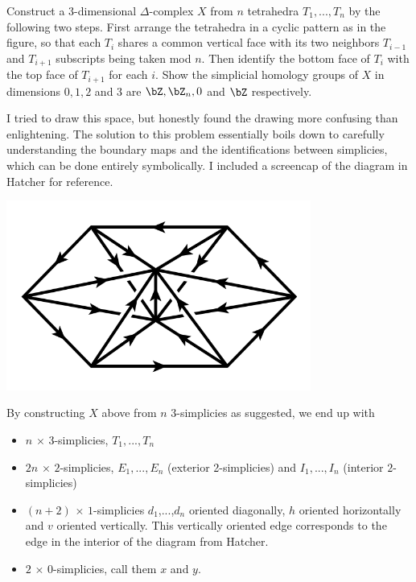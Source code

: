 \begin{homework}[e]
\begin{prf}
  \end{prf}
  \prob[2.1.8] Construct a 3-dimensional $\Delta$-complex $X$ from $n$ tetrahedra $T_1,...,T_n$ by the following two steps. First arrange the tetrahedra in a cyclic pattern as in the figure, so that each $T_i$ shares a common vertical face with its two neighbors $T_{i-1}$ and $T_{i+1}$ subscripts being taken mod $n$. Then identify the bottom face of $T_i$ with the top face of $T_{i+1}$ for each $i$. Show the simplicial homology groups of $X$ in dimensions $0,1,2$ and $3$ are $\bZ,\bZ_n, 0$ and $\bZ$ respectively.
  \begin{prf}
    I tried to draw this space, but honestly found the drawing more confusing than enlightening. The solution to this problem essentially boils down to carefully understanding the boundary maps and the identifications between simplicies, which can be done entirely symbolically. I included a screencap of the diagram in Hatcher for reference.
    \begin{center}
      \includegraphics[width=10cm]{figures/hwk8-fig3.png}
      \label{fig:prob4-1}
    \end{center}
    By constructing $X$ above from $n$ $3$-simplicies as suggested, we end up with
    \begin{itemize}
      \item $n$ $\times$ 3-simplicies, $T_1,...,T_n$
      \item $2n$ $\times$ $2$-simplicies, $E_1,...,E_n$ (exterior 2-simplicies) and $I_1,...,I_n$ (interior $2$-simplicies)
      \item $(n+2)$ $\times$ $1$-simplicies $d_1$,...,$d_n$ oriented diagonally, $h$ oriented horizontally and $v$ oriented vertically. This vertically oriented edge corresponds to the edge in the interior of the diagram from Hatcher.
      \item $2$ $\times$ $0$-simplicies, call them $x$ and $y$.

\end{itemize}
\end{prf}
\end{homework}
